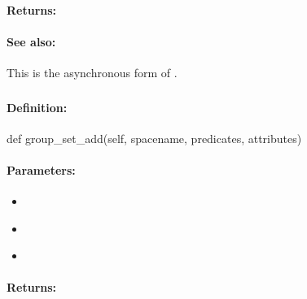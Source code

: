 \paragraph{Returns:}


\paragraph{See also:}  This is the asynchronous form of .

\pagebreak
\subsubsection{}
\label{api:python:group_set_add}


\paragraph{Definition:}
\begin{pythoncode}
def group_set_add(self, spacename, predicates, attributes)
\end{pythoncode}

\paragraph{Parameters:}
\begin{itemize}[noitemsep]
\item {}\\

\item {}\\

\item {}\\

\end{itemize}

\paragraph{Returns:}


\pagebreak
\subsubsection{}
\label{api:python:async_group_set_add}


